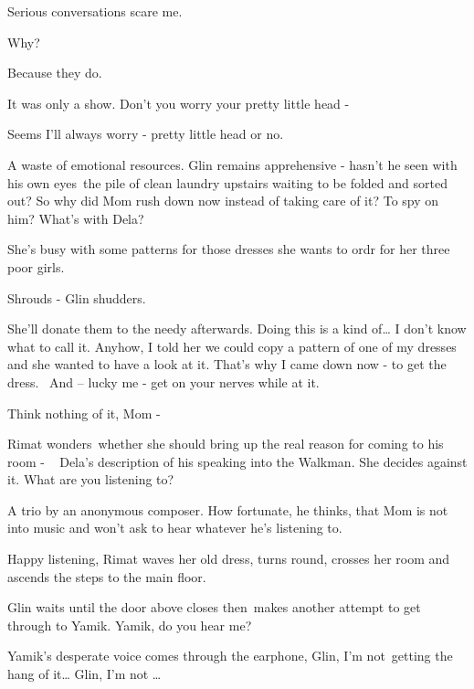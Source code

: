 \documentclass[12pt]{book}
\begin{document}
{\textquotedbl}Serious conversations scare me.{\textquotedbl}

{\textquotedbl}Why?{\textquotedbl}

{\textquotedbl}Because they do.{\textquotedbl}

{\textquotedbl}It was only a show. Don't you worry your pretty little head -{\textquotedbl}

{\textquotedbl}Seems I'll always worry - pretty little head or no.{\textquotedbl}

{\textquotedbl}A waste of emotional resources.{\textquotedbl} Glin remains apprehensive - hasn't he seen with his own
eyes~the pile of clean laundry upstairs waiting to be folded and sorted out? So why did Mom rush down now instead of
taking care of it? To spy on him? {\textquotedbl}What's with Dela?{\textquotedbl}~

{\textquotedbl}She's busy with some patterns for those dresses she wants to ordr for her three poor
girls.{\textquotedbl}

{\textquotedbl}Shrouds - {\textquotedbl} Glin shudders.

{\textquotedbl}She'll donate them to the needy afterwards. Doing this is a kind of{\dots} I don't know what to call it.
Anyhow, I told her we could copy a pattern of one of my dresses and she wanted to have a look at it. That's why I came
down now - to get the dress. ~And -- lucky me - get on your nerves while at it.{\textquotedbl}

{\textquotedbl}Think nothing of it, Mom -{\textquotedbl}

Rimat wonders~whether she should bring up the real reason for coming to his room - ~ Dela's description of his speaking
into the Walkman. She decides against it. {\textquotedbl}What are you listening to?{\textquotedbl}

{\textquotedbl}A trio by an anonymous composer.{\textquotedbl} How fortunate, he thinks, that Mom is not into music and
won't ask to hear whatever he's listening to.

{\textquotedbl}Happy listening,{\textquotedbl} Rimat waves her old dress, turns round, crosses her room and ascends the
steps to the main floor.

Glin waits until the door above closes then~makes another attempt to get through to Yamik. {\textquotedbl}Yamik, do you
hear me?{\textquotedbl}

Yamik's desperate voice comes through the earphone, {\textquotedbl}Glin, I'm not~getting the hang of it{\dots} Glin, I'm
not {\dots}{\textquotedbl}
\end{document}
